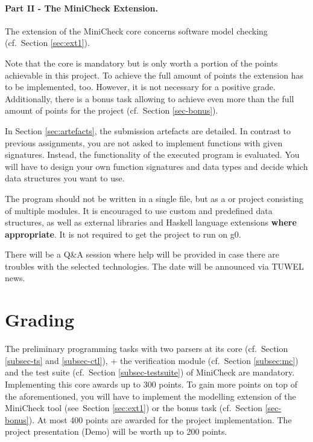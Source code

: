 \documentclass{article}
\begin{document}
\paragraph{Part II - The MiniCheck Extension.} The extension of the MiniCheck core concerns software model checking (cf.~Section \ref{sec:ext1}).

Note that the core is mandatory but is only worth a portion of the points achievable in this project. 
To achieve the full amount of points the extension has to be implemented, too.
However, it is not necessary for a positive grade. 
Additionally, there is a bonus task allowing to achieve even more than 
the full amount of points for the project (cf.~Section \ref{sec-bonus}). 
\bigskip

In Section \ref{sec:artefacts}, the submission artefacts are detailed. In contrast to previous assignments, you are not asked to implement functions with given signatures. 
Instead, the functionality of the executed program is evaluated. 
You will have to design your own function signatures and data types and decide 
which data structures you want to use.

The program should not be written in a single file, but as a \href{https://docs.haskellstack.org/en/stable/README/}{} 
or \href{https://cabal.readthedocs.io/en/3.4/}{} project consisting of multiple modules. 
It is encouraged to use custom and predefined data structures, as well as external libraries 
and Haskell language extensions \textbf{where appropriate}. It is not required to get the project to run on g0.

There will be a Q\&A session where help will be provided in case there are troubles with the selected technologies. 
The date will be announced via TUWEL news.

\section{Grading}
The preliminary programming tasks with two parsers at its core (cf.~Section \ref{subsec-ts} and \ref{subsec-ctl}), +
the verification module (cf.~Section \ref{subsec:mc}) and the test suite (cf.~Section \ref{subsec-testsuite}) 
of MiniCheck are mandatory. 
Implementing this core awards up to 300 points.
To gain more points on top of the aforementioned, you will have to implement the modelling
extension of the MiniCheck tool (see~Section \ref{sec:ext1}) 
or the bonus task (cf.~Section \ref{sec-bonus}). 
At most 400 points are awarded for the project implementation.
The project presentation (Demo) will be worth up to 200 points. 
\end{document}

